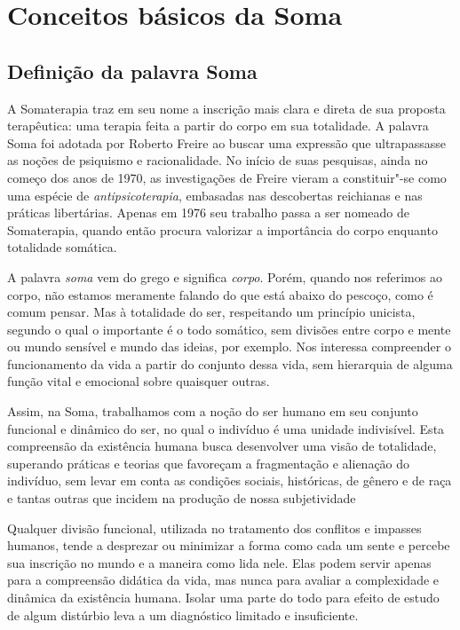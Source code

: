 \chapter{Conceitos básicos da Soma}

\section{Definição da palavra Soma}

A Somaterapia traz em seu nome a inscrição mais clara e direta de sua
proposta terapêutica: uma terapia feita a partir do corpo em sua
totalidade. A palavra Soma foi adotada por Roberto Freire ao buscar uma
expressão que ultrapassasse as noções de psiquismo e racionalidade. No
início de suas pesquisas, ainda no começo dos anos de 1970, as investigações de
Freire vieram a constituir"-se como uma espécie de
\emph{antipsicoterapia}, embasadas nas descobertas reichianas e nas
práticas libertárias. Apenas em 1976 seu trabalho passa a ser nomeado de
Somaterapia, quando então procura valorizar a importância do corpo
enquanto totalidade somática.

A palavra \emph{soma} vem do grego e significa \emph{corpo}. Porém,
quando nos referimos ao corpo, não estamos meramente falando do que está
abaixo do pescoço, como é comum pensar. Mas à totalidade do ser,
respeitando um princípio unicista, segundo o qual o importante é o
todo somático, sem divisões entre corpo e mente ou mundo sensível e
mundo das ideias, por exemplo. Nos interessa compreender o funcionamento
da vida a partir do conjunto dessa vida, sem hierarquia de alguma função
vital e emocional sobre quaisquer outras.

Assim, na Soma, trabalhamos com a noção do ser humano em seu conjunto
funcional e dinâmico do ser, no qual o indivíduo é uma unidade
indivisível. Esta compreensão da existência humana busca desenvolver uma
visão de totalidade, superando práticas e teorias que favoreçam a
fragmentação e alienação do indivíduo, sem levar em conta as condições
sociais, históricas, de gênero e de raça e tantas outras que incidem na
produção de nossa subjetividade

Qualquer divisão funcional, utilizada no tratamento dos conflitos e
impasses humanos, tende a desprezar ou minimizar a forma como cada um
sente e percebe sua inscrição no mundo e a maneira como lida nele. Elas
podem servir apenas para a compreensão didática da vida, mas nunca para
avaliar a complexidade e dinâmica da existência humana. Isolar uma parte
do todo para efeito de estudo de algum distúrbio leva a um diagnóstico
limitado e insuficiente.

